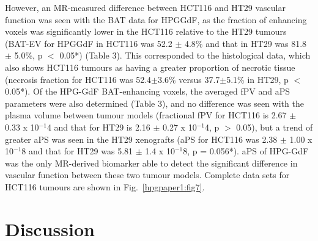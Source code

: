 However, an MR-measured difference between HCT116 and HT29 vascular function was seen with the \acs{BAT} data for HPGGdF, as the fraction of enhancing voxels was significantly lower in the HCT116 relative to the HT29 tumours (BAT-EV for HPGGdF in HCT116 was 52.2 $\pm$ 4.8\% and that in HT29 was 81.8 $\pm$ 5.0\%, p $<$ 0.05*) (Table 3).
This corresponded to the histological data, which also shows HCT116 tumours as having a greater proportion of necrotic tissue (necrosis fraction for HCT116 was 52.4$\pm$3.6\% versus 37.7$\pm$5.1\% in HT29, p $<$ 0.05*).
Of the \acs{HPG-GdF} \acs{BAT}-enhancing voxels, the averaged \acs{fPV} and \acs{aPS} parameters were also determined (Table 3), and no difference was seen with the plasma volume between tumour models (fractional \acs{fPV} for HCT116 is 2.67 $\pm$ 0.33 x 10$^{-1}$4 and that for HT29 is 2.16 $\pm$ 0.27 x 10$^{-1}$4, p $>$ 0.05), but a trend of greater \acs{aPS} was seen in the HT29 xenografts (aPS for HCT116 was 2.38 $\pm$ 1.00 x 10$^{-1}$8 and that for HT29 was 5.81 $\pm$ 1.4 x 10$^{-1}$8, p = 0.056*).
\acs{aPS} of \acs{HPG-GdF} was the only MR-derived biomarker able to detect the significant difference in vascular function between these two tumour models.
Complete data sets for HCT116 tumours are shown in Fig.~\ref{hpgpaper1:fig7}.

\section{Discussion}

